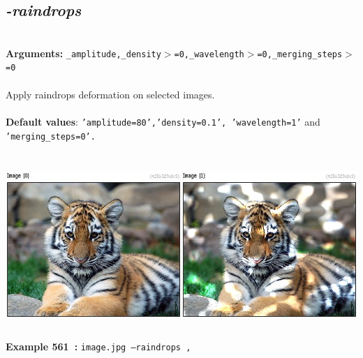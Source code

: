 \documentclass[a4paper,11pt,twoside]{book}
\begin{document}
\subsection{\emph{-raindrops} }\vspace*{-0.5em}
~\\\textbf{Arguments: } 
{\small \texttt{\_amplitude,\_density$>$=0,\_wavelength$>$=0,\_merging\_steps$>$=0}}\\~\\
Apply raindrops deformation on selected images.
~\\~\\\textbf{Default values}: {\small \texttt{'amplitude=80','density=0.1', 'wavelength=1'} and \texttt{'merging\_steps=0'.}}
\begin{center}\includegraphics[keepaspectratio=true,height=7cm,width=\textwidth]{img/gmic_def561.jpg}\\
{\footnotesize \textbf{Example 561~:} \texttt{image.jpg --raindrops ,}}
\end{center}
\end{document}
